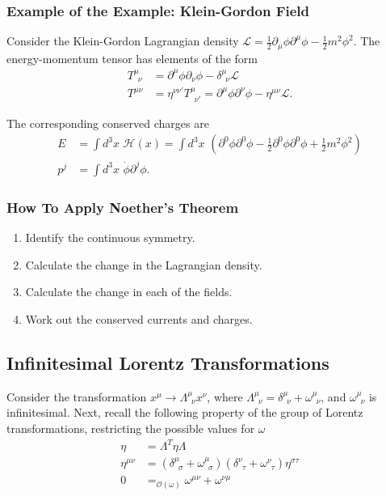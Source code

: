 \subsubsection*{Example of the Example: Klein-Gordon Field}

Consider the Klein-Gordon Lagrangian density $\mathscr{L} = \frac{1}{2} \partial_\mu \phi \partial^\mu \phi - \frac{1}{2}m^2 \phi^2$. The energy-momentum tensor has elements of the form
\begin{align}
T^\mu_{\,\,\,\nu} &= \partial^\mu \phi \partial_\nu \phi - \delta^\mu_{\,\,\,\nu}\mathscr{L} \\
T^{\mu \nu} &= \eta^{\nu \nu'} T^\mu_{\,\,\,\nu'} = \partial^\mu \phi \partial^\nu \phi - \eta^{\mu \nu} \mathscr{L}.
\end{align}

\noindent The corresponding conserved charges are
\begin{align}
E &= \int d^3x \,\, \mathscr{H}(x) = \int d^3x \,\, (\partial^0 \phi \partial^0 \phi - \frac{1}{2}\partial^0 \phi \partial^0 \phi + \frac{1}{2} m^2 \phi^2) \\
p^j &= \int d^3x \,\, \dot{\phi} \partial^j \phi .
\end{align}

\subsubsection*{How To Apply Noether's Theorem}
\begin{enumerate}
\item Identify the continuous symmetry. \\
\item Calculate the change in the Lagrangian density. \\
\item Calculate the change in each of the fields. \\
\item Work out the conserved currents and charges.
\end{enumerate}

\subsection*{Infinitesimal Lorentz Transformations}

\noindent Consider the transformation $x^\mu \rightarrow \Lambda^\mu_{\,\,\,\nu} x^\nu$, where $\Lambda^\mu_{\,\,\,\nu} = \delta^\mu_{\,\,\,\nu} + \omega^\mu_{\,\,\,\nu}$, and $\omega^\mu_{\,\,\,\nu}$ is infinitesimal. Next, recall the following property of the group of Lorentz transformations, restricting the possible values for $\omega$
\begin{align}
\eta &= \Lambda^T \eta \Lambda \\
\eta^{\mu \nu} &= (\delta^\mu_{\,\,\,\sigma} + \omega^\mu_{\,\,\,\sigma} ) (\delta^\nu_{\,\,\,\tau} + \omega^\nu_{\,\,\,\tau} ) \eta^{\sigma \tau} \\
0 &=_{\mathcal{O}(\omega)} \omega^{\mu \nu} + \omega^{\nu \mu}
\end{align}

